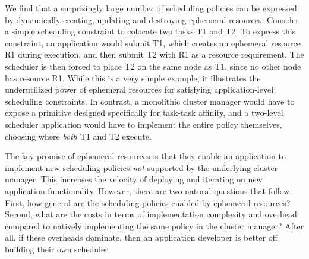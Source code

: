 We find that a surprisingly large number of scheduling policies can be expressed by dynamically creating, updating and destroying ephemeral resources. Consider a simple scheduling constraint to colocate two tasks T1 and T2. To express this constraint, an application would submit T1, which creates an ephemeral resource R1 during execution, and then submit T2 with R1 as a resource requirement. The scheduler is then forced to place T2 on the same node as T1, since no other node has resource R1. While this is a very simple example, it illustrates the underutilized power of ephemeral resources for satisfying application-level scheduling constraints. In contrast, a monolithic cluster manager would have to expose a primitive designed specifically for task-task affinity, and a two-level scheduler application would have to implement the entire policy themselves, choosing where \emph{both} T1 and T2 execute.


The key promise of ephemeral resources is that they enable an application to implement new scheduling policies \emph{not} supported by the underlying cluster manager. This increases the velocity of deploying and iterating on new application functionality. %
However, there are two natural questions that follow. First, how general are the scheduling policies enabled by ephemeral resources? Second, what are the costs in terms of implementation complexity and overhead compared to natively implementing the same policy in the cluster manager?
After all, if these overheads dominate, then an application developer is better off building their own scheduler.

